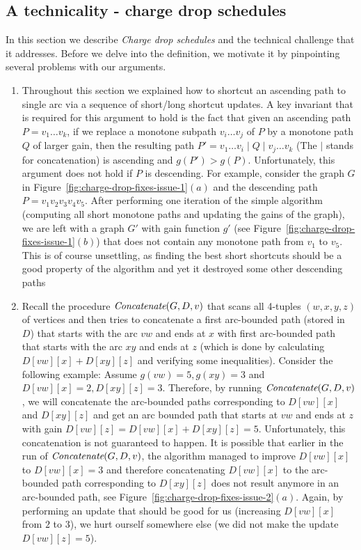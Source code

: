 \documentclass[11pt]{article}
\newcommand{\Concat}{\mbox{{\it Concatenate}}}
\begin{document}
\subsection{A technicality - charge drop schedules}

In this section we describe
\emph{Charge drop schedules} 
and the technical 
challenge that it addresses. Before we delve into the definition, we motivate it by pinpointing several problems with our arguments.
\begin{enumerate}
    \item Throughout this section we explained how to shortcut an ascending path  to single arc via a sequence of 
  short/long shortcut updates. A key invariant that is required for this argument to hold is the fact that given an ascending path $P = v_1\ldots v_k$, if we replace a monotone subpath $v_i \ldots v_j$ of $P$ by a monotone path  $Q$ of larger gain, then the resulting path $P' = v_1\ldots v_i \mid Q \mid v_j \ldots v_k$ (The $\mid$ stands for concatenation) is ascending and $g(P')> g(P)$. Unfortunately, this argument does not hold if $P$ is descending. For example, consider the graph $G$ in Figure~\ref{fig:charge-drop-fixes-issue-1}$(a)$ and the descending path $P = v_1 v_2 v_3 v_4 v_5$. After performing one iteration of the simple algorithm (computing all short monotone paths and updating the gains of the graph), we are left with a graph $G'$ with gain function $g'$ (see Figure~\ref{fig:charge-drop-fixes-issue-1}$(b)$) that does not contain any monotone path from $v_1$ to $v_5$. This is of course unsettling, as finding the best short shortcuts should be a good property of the algorithm and yet it destroyed some other descending paths

    \item Recall the procedure $\Concat(G,D,v)$ that scans all 4-tuples $(w,x,y,z)$ of vertices and then tries to concatenate a first arc-bounded path (stored in $D$) that starts with the arc $vw$ and ends at $x$ with first arc-bounded path that starts with the arc $xy$ and ends at $z$ (which is done by calculating $D[vw][x]+D[xy][z]$ and verifying some inequalities). Consider the following example: Assume $g(vw) = 5, g(xy) = 3$ and $D[vw][x] = 2, D[xy][z] = 3$. Therefore, by running  $\Concat(G,D,v)$, we will concatenate the arc-bounded paths corresponding to $D[vw][x]$ and $D[xy][z]$ and get an arc bounded path that starts at $vw$ and ends at $z$ with gain $D[vw][z] = D[vw][x] + D[xy][z] = 5$. Unfortunately, this concatenation is not guaranteed to happen.  It is possible that earlier in the run of $\Concat(G,D,v)$, the algorithm managed to improve $D[vw][x]$ to $D[vw][x] = 3$ and therefore concatenating $D[vw][x]$ to the arc-bounded path corresponding to $D[xy][z]$ does not result anymore in an arc-bounded path, see Figure~\ref{fig:charge-drop-fixes-issue-2}$(a)$. Again, by performing an update that should be good for us (increasing $D[vw][x]$ from $2$ to $3$), we hurt ourself somewhere else (we did not make the update $D[vw][z] = 5$). 
\end{enumerate}
\end{document}
